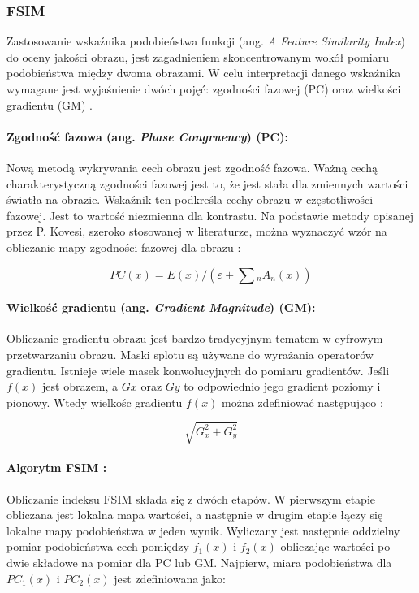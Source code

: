 \documentclass{article}
\begin{document}
\subsubsection{FSIM}

Zastosowanie wskaźnika podobieństwa funkcji (ang. \emph{A Feature Similarity Index}) do oceny jakości obrazu, 
jest zagadnieniem skoncentrowanym wokół pomiaru podobieństwa między dwoma obrazami.
W celu interpretacji danego wskaźnika wymagane jest wyjaśnienie dwóch pojęć: zgodności fazowej (PC) oraz wielkości gradientu (GM) \cite{fsim_theory}.

\paragraph{Zgodność fazowa (ang. \emph{Phase Congruency}) (PC):}
Nową metodą wykrywania cech obrazu jest zgodność fazowa. Ważną cechą charakterystyczną zgodności fazowej jest to,
że jest stała dla zmiennych wartości światła na obrazie. Wskaźnik ten podkreśla cechy obrazu w częstotliwości fazowej. 
Jest to wartość niezmienna dla kontrastu. Na podstawie metody opisanej przez P. Kovesi, szeroko stosowanej w literaturze, 
można wyznaczyć wzór na obliczanie mapy zgodności fazowej dla obrazu \cite{pc}:

\begin{equation}
PC(x) = E(x) / (\varepsilon + \sum\limits{_{n}} A_n(x))
\end{equation}

\paragraph{Wielkość gradientu  (ang. \emph{Gradient Magnitude}) (GM):}
Obliczanie gradientu obrazu jest bardzo tradycyjnym tematem w cyfrowym przetwarzaniu obrazu. 
Maski splotu są używane do wyrażania operatorów gradientu. Istnieje wiele masek konwolucyjnych do pomiaru gradientów. 
Jeśli $f(x)$ jest obrazem, a $Gx$ oraz $Gy$ to odpowiednio jego gradient poziomy i pionowy. 
Wtedy wielkośc gradientu $f(x)$ można zdefiniować następująco \cite{gm}:

\begin{equation}
\sqrt{G^2_x+G^2_y}
\end{equation}

\paragraph{Algorytm FSIM \cite{fsim_alg}:}
Obliczanie indeksu FSIM składa się z dwóch etapów. 
W pierwszym etapie obliczana jest lokalna mapa wartości, a następnie w drugim etapie łączy się lokalne mapy podobieństwa w jeden wynik.
Wyliczany jest następnie oddzielny pomiar podobieństwa cech pomiędzy $f_1(x)$ i $f_2(x)$ obliczając wartości po dwie 
składowe na pomiar dla PC lub GM. Najpierw, miara podobieństwa dla $PC_1 (x)$ i $PC_2(x)$ jest zdefiniowana jako:
\end{document}
